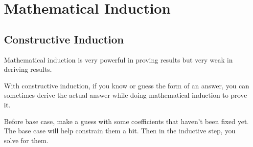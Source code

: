 \section{Mathematical Induction}

\subsection*{Constructive Induction}

Mathematical induction is very powerful in proving results but very weak in deriving results.

With constructive induction, if you know or guess the form of an answer, you can sometimes derive the actual answer while doing mathematical induction to prove it.

Before base case, make a guess with some coefficients that haven't been fixed yet. The base case will help constrain them a bit. Then in the inductive step, you solve for them.
